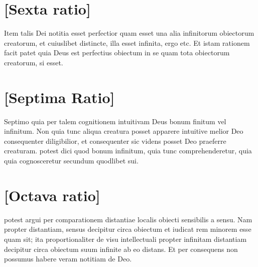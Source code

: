 \documentclass[twoside, openright]{report}
\newcommand{\name}[1]{\textsc{#1}}
\begin{document}
        \bigskip
         \section*{[Sexta ratio]} 
        \pstart
        Item talis Dei notitia esset perfectior quam esset una alia  infinitorum obiectorum creatorum, et cuiuslibet distincte,  illa esset infinita, ergo etc. Et istam rationem facit \edtext{\name{Adam,}\index[persons]{Adam Wodeham}}{\Bfootnote{idem R SV n94}}   patet quia Deus est perfectius obiectum in se quam tota   obiectorum creatorum, si esset.
        \pend
      
        \bigskip
         \section*{[Septima Ratio]} 
        \pstart
        Septimo  quia  per talem cognitionem intuitivam Deus  bonum finitum vel infinitum. Non  quia tunc aliqua creatura posset apparere intuitive melior Deo  consequenter diligibilior, et consequenter sic videns posset  Deo praeferre creaturam.  potest dici quod  bonum infinitum, quia  tunc comprehenderetur, quia quia cognosceretur secundum quodlibet sui.
        \pend
      
        \bigskip
         \section*{[Octava ratio]} 
        \pstart
          potest argui per comparationem distantiae localis obiecti sensibilis a sensu. Nam propter  distantiam, sensus decipitur circa obiectum  et iudicat rem minorem esse quam sit; ita proportionaliter de visu intellectuali propter infinitam distantiam decipitur circa obiectum suum infinite  ab eo distans. Et per consequens non possumus habere veram notitiam de  Deo.
        \pend
     
\end{document}
